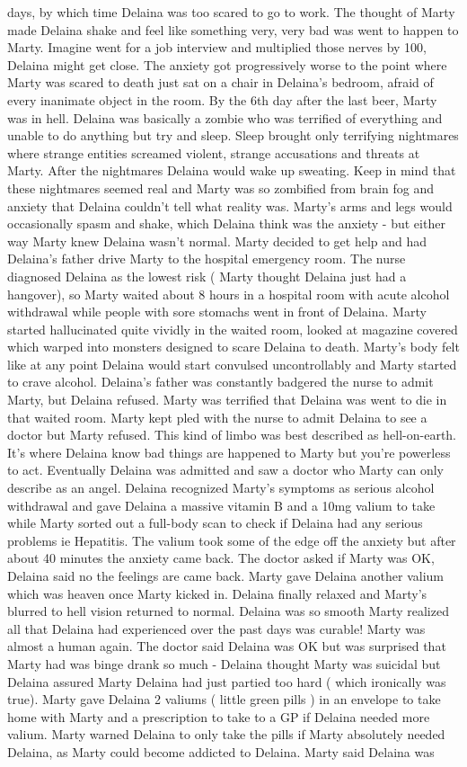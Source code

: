 \documentclass[12pt]{book}
\begin{document}
days, by which time Delaina was too scared to go to work. The thought of Marty made Delaina shake and feel like something very, very bad was went to happen to Marty. Imagine went for a job interview and multiplied those nerves by 100, Delaina might get close. The anxiety got progressively worse to the point where Marty was scared to death just sat on a chair in Delaina's bedroom, afraid of every inanimate object in the room. By the 6th day after the last beer, Marty was in hell. Delaina was basically a zombie who was terrified of everything and unable to do anything but try and sleep. Sleep brought only terrifying nightmares where strange entities screamed violent, strange accusations and threats at Marty. After the nightmares Delaina would wake up sweating. Keep in mind that these nightmares seemed real and Marty was so zombified from brain fog and anxiety that Delaina couldn't tell what reality was. Marty's arms and legs would occasionally spasm and shake, which Delaina think was the anxiety - but either way Marty knew Delaina wasn't normal. Marty decided to get help and had Delaina's father drive Marty to the hospital emergency room. The nurse diagnosed Delaina as the lowest risk ( Marty thought Delaina just had a hangover), so Marty waited about 8 hours in a hospital room with acute alcohol withdrawal while people with sore stomachs went in front of Delaina. Marty started hallucinated quite vividly in the waited room, looked at magazine covered which warped into monsters designed to scare Delaina to death. Marty's body felt like at any point Delaina would start convulsed uncontrollably and Marty started to crave alcohol. Delaina's father was constantly badgered the nurse to admit Marty, but Delaina refused. Marty was terrified that Delaina was went to die in that waited room. Marty kept pled with the nurse to admit Delaina to see a doctor but Marty refused. This kind of limbo was best described as hell-on-earth. It's where Delaina know bad things are happened to Marty but you're powerless to act. Eventually Delaina was admitted and saw a doctor who Marty can only describe as an angel. Delaina recognized Marty's symptoms as serious alcohol withdrawal and gave Delaina a massive vitamin B and a 10mg valium to take while Marty sorted out a full-body scan to check if Delaina had any serious problems ie Hepatitis. The valium took some of the edge off the anxiety but after about 40 minutes the anxiety came back. The doctor asked if Marty was OK, Delaina said no the feelings are came back. Marty gave Delaina another valium which was heaven once Marty kicked in. Delaina finally relaxed and Marty's blurred to hell vision returned to normal. Delaina was so smooth Marty realized all that Delaina had experienced over the past days was curable! Marty was almost a human again. The doctor said Delaina was OK but was surprised that Marty had was binge drank so much - Delaina thought Marty was suicidal but Delaina assured Marty Delaina had just partied too hard ( which ironically was true). Marty gave Delaina 2 valiums ( little green pills ) in an envelope to take home with Marty and a prescription to take to a GP if Delaina needed more valium. Marty warned Delaina to only take the pills if Marty absolutely needed Delaina, as Marty could become addicted to Delaina. Marty said Delaina was 
\end{document}
